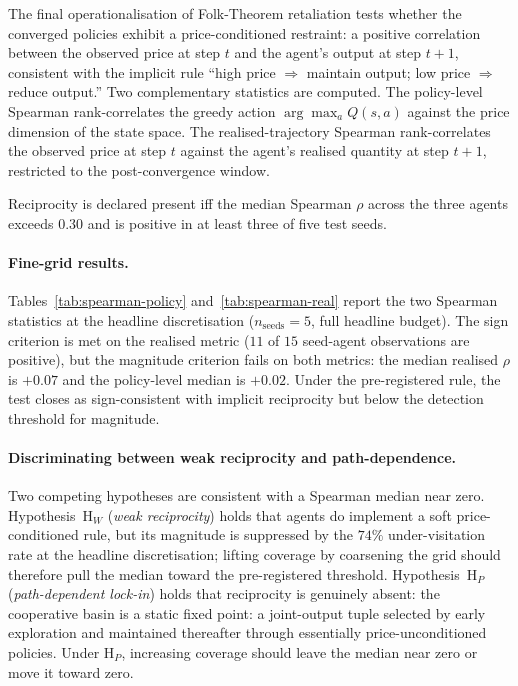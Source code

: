 The final operationalisation of Folk-Theorem retaliation tests
whether the converged policies exhibit a price-conditioned
restraint: a positive correlation between the observed price at
step $t$ and the agent's output at step $t+1$, consistent with
the implicit rule ``high price $\Rightarrow$ maintain output;
low price $\Rightarrow$ reduce output.'' Two complementary
statistics are computed. The policy-level Spearman
rank-correlates the greedy action $\arg\max_a Q(s,a)$ against
the price dimension of the state space. The
realised-trajectory Spearman rank-correlates the observed
price at step $t$ against the agent's realised quantity at step
$t+1$, restricted to the post-convergence window.

\begin{criterion*}
Reciprocity is declared present iff the median Spearman $\rho$
across the three agents exceeds $0.30$ and is positive in at
least three of five test seeds.
\end{criterion*}

\paragraph{Fine-grid results.}
Tables~\ref{tab:spearman-policy} and~\ref{tab:spearman-real}
report the two Spearman statistics at the headline
discretisation ($n_{\text{seeds}} = 5$, full headline budget).
The sign criterion is met on the realised metric ($11$ of $15$
seed-agent observations are positive), but the magnitude
criterion fails on both metrics: the median realised $\rho$ is
$\mathbf{+0.07}$ and the policy-level median is $+0.02$. Under the
pre-registered rule, the test closes as sign-consistent with
implicit reciprocity but below the detection threshold for
magnitude.



\paragraph{Discriminating between weak reciprocity and
path-dependence.}
Two competing hypotheses are consistent with a Spearman median
near zero. Hypothesis~H$_W$ (\emph{weak reciprocity}) holds that
agents do implement a soft price-conditioned rule, but its
magnitude is suppressed by the $74\%$ under-visitation rate at
the headline discretisation; lifting coverage by coarsening the
grid should therefore pull the median toward the pre-registered
threshold. Hypothesis~H$_P$ (\emph{path-dependent lock-in})
holds that reciprocity is genuinely absent: the cooperative basin
is a static fixed point: a joint-output tuple selected
by early exploration and maintained thereafter through essentially
price-unconditioned policies. Under H$_P$, increasing coverage
should leave the median near zero or move it toward zero.

